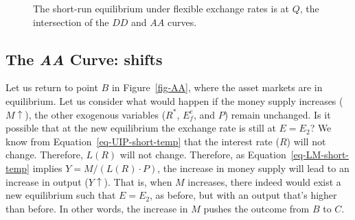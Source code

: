 \documentclass[
  letterpaper,
]{book}
\theoremstyle{plain}
\theoremstyle{remark}
\begin{document}
\begin{figure}


\caption{\label{fig-AADD}The short-run equilibrium under flexible
exchange rates is at \(Q\), the intersection of the \(DD\) and \(AA\)
curves.}

\end{figure}%

\subsection{\texorpdfstring{The \emph{AA} Curve:
shifts}{The AA Curve: shifts}}\label{sec-AA-shifts}

Let us return to point \(B\) in Figure~\ref{fig-AA}, where the asset
markets are in equilibrium. Let us consider what would happen if the
money supply increases (\(M\uparrow\)), the other exogenous variables
(\(R^*\), \(E_f^e\), and \(P\)) remain unchanged. Is it possible that at
the new equilibrium the exchange rate is still at \(E=E_2\)? We know
from Equation~\ref{eq-UIP-short-temp} that the interest rate (\(R\))
will not change. Therefore, \(L(R)\) will not change. Therefore, as
Equation~\ref{eq-LM-short-temp} implies \(Y=M/(L(R)\cdot P)\), the
increase in money supply will lead to an increase in output
(\(Y\uparrow\)). That is, when \(M\) increases, there indeed would exist
a new equilibrium such that \(E=E_2\), as before, but with an output
that's higher than before. In other words, the increase in \(M\) pushes
the outcome from \(B\) to \(C\).
\end{document}
